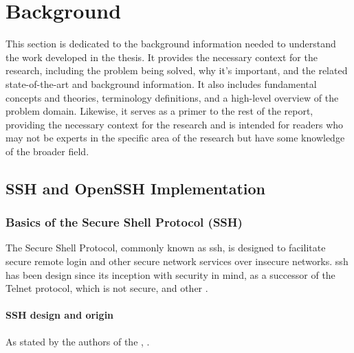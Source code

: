 \chapter{Background}\label{sec:background}

% 
%

This section is dedicated to the background information needed to understand the work developed in the thesis. It provides the necessary context for the research, including the problem being solved, why it's important, and the related state-of-the-art and background information. It also includes fundamental concepts and theories, terminology definitions, and a high-level overview of the problem domain. Likewise, it serves as a primer to the rest of the report, providing the necessary context for the research and is intended for readers who may not be experts in the specific area of the research but have some knowledge of the broader field.

\section{SSH and OpenSSH Implementation}\label{sec:background:ssh}

    \subsection{Basics of the Secure Shell Protocol (SSH)}
    
    The Secure Shell Protocol, commonly known as \acrshort{ssh}, is designed to facilitate secure remote login and other secure network services over insecure networks. \acrshort{ssh} has been design since its inception with security in mind, as a successor of the Telnet protocol, which is not secure, and other  \cite{SSHkex22}. 
    
    \subsubsection{SSH design and origin}
    As stated by the authors of the ,  \cite{SSHReport18}.


